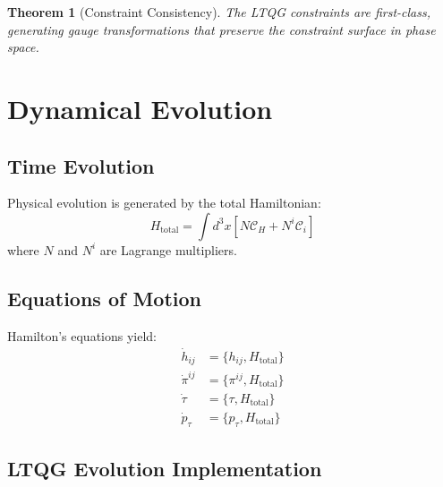 \documentclass[11pt,a4paper]{article}
\newtheorem{theorem}{Theorem}[section]
\theoremstyle{definition}
\theoremstyle{remark}
\newcommand{\constraint}{\mathcal{C}}
\newcommand{\Poisson}[2]{\{#1, #2\}}
\begin{document}
\begin{theorem}[Constraint Consistency]
The LTQG constraints are first-class, generating gauge transformations that preserve the constraint surface in phase space.
\end{theorem}

\section{Dynamical Evolution}

\subsection{Time Evolution}

Physical evolution is generated by the total Hamiltonian:
\begin{equation}
H_{\text{total}} = \int d^3x \left[ N \constraint_H + N^i \constraint_i \right]
\end{equation}
where $N$ and $N^i$ are Lagrange multipliers.

\subsection{Equations of Motion}

Hamilton's equations yield:
\begin{align}
\dot{h}_{ij} &= \Poisson{h_{ij}}{H_{\text{total}}} \\
\dot{\pi}^{ij} &= \Poisson{\pi^{ij}}{H_{\text{total}}} \\
\dot{\tau} &= \Poisson{\tau}{H_{\text{total}}} \\
\dot{p}_\tau &= \Poisson{p_\tau}{H_{\text{total}}}
\end{align}

\subsection{LTQG Evolution Implementation}
\end{document}
